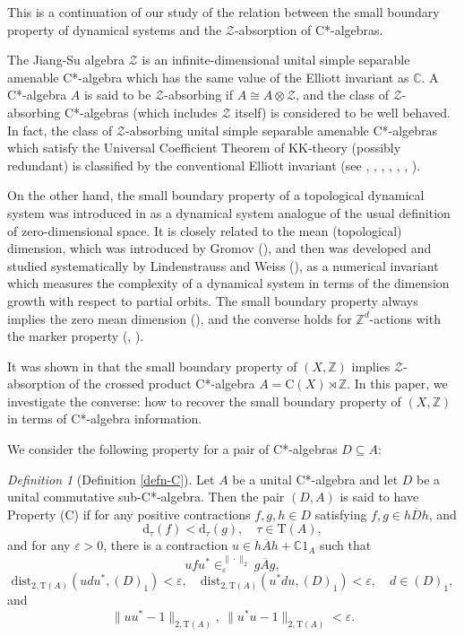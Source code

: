 \documentclass[12pt, oneside, psamsfonts]{amsart}
\theoremstyle{definition}
\theoremstyle{remark}
\numberwithin{equation}{section}
\newcommand{\norm}[1]{\| #1\|}
\newcommand{\Int}{\mathbb Z}
\newcommand{\Comp}{\mathbb C}
\newcommand{\eps}{\varepsilon}
\newcommand{\tr}{\mathrm{T}}
\begin{document}
This is a continuation of our study \cite{EN-SBP-I} of the relation between the small boundary property of dynamical systems and the $\mathcal Z$-absorption of C*-algebras.

The Jiang-Su algebra $\mathcal Z$ is an infinite-dimensional unital simple separable amenable C*-algebra which has the same value of the Elliott invariant as $\Comp$. A C*-algebra $A$ is said to be $\mathcal Z$-absorbing if $A \cong A \otimes \mathcal Z$, and the class of $\mathcal Z$-absorbing C*-algebras (which includes $\mathcal Z$ itself) is considered to be well behaved. In fact, the class of $\mathcal Z$-absorbing unital simple separable amenable C*-algebras which satisfy the Universal Coefficient Theorem of KK-theory (possibly redundant) is  classified by the conventional Elliott invariant (see \cite{GLN-TAS-1}, \cite{GLN-TAS-2}, \cite{EN-K0-Z}, \cite{EGLN-DR}, \cite{EGLN-ASH}, \cite{TWW-QD}, \cite{CETWW-dim-n}).

On the other hand, the small boundary property of a topological dynamical system was introduced in \cite{Lindenstrauss-Weiss-MD} as a dynamical system analogue of the usual definition of zero-dimensional space. It is closely related to the mean (topological) dimension, which was introduced by Gromov (\cite{Gromov-MD}), and then was developed and studied systematically by Lindenstrauss and Weiss (\cite{Lindenstrauss-Weiss-MD}), as a numerical invariant which measures the complexity of a dynamical system in terms of the dimension growth with respect to partial orbits. The small boundary property always implies the zero mean dimension (\cite{Lindenstrauss-Weiss-MD}), and the converse holds for $\mathbb Z^d$-actions with the marker property (\cite{Lind-MD}, \cite{GLT-Zk}).

It was shown in \cite{EN-MD0} that the small boundary property of $(X, \Int)$ implies $\mathcal Z$-absorption of the crossed product C*-algebra $ A = \mathrm{C}(X) \rtimes \Int$. In this paper, we investigate the converse: how to recover the small boundary property of $(X, \Int)$ in terms of C*-algebra information.

We consider the following property for a pair of C*-algebras $D \subseteq A$:  
\newtheorem*{defn-n}{Definition}
\begin{defn-n}[Definition \ref{defn-C}]
Let $A$ be a unital C*-algebra and let $D$ be a unital commutative sub-C*-algebra. Then the pair $(D, A)$ is said to have Property (C) if for any positive contractions $f, g, h \in D$ satisfying $f, g \in \overline{hDh}$, and $$\mathrm{d}_\tau(f) < \mathrm{d}_\tau(g),\quad \tau \in \tr(A),$$ and for any $\eps>0$, there is a contraction $u \in \overline{hAh} + \Comp 1_A$ such that
$$ u f u^* \in_\eps^{\norm{\cdot}_2} \overline{gAg},$$
$$\mathrm{dist}_{2, \tr(A)}(udu^*, (D)_1) < \eps,\quad \mathrm{dist}_{2, \tr(A)}(u^*du, (D)_1) < \eps, \quad d \in (D)_1, $$ 
and
$$\norm{uu^* - 1}_{2, \tr(A)},\  \norm{u^*u - 1}_{2, \tr(A)} < \eps.$$
\end{defn-n}
\end{document}
